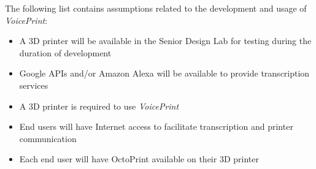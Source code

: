 The following list contains assumptions related to the development and usage of \textit{VoicePrint}:

\begin{itemize}
  \item A 3D printer will be available in the Senior Design Lab for testing during the duration of development
  \item Google APIs and/or Amazon Alexa will be available to provide transcription services
  \item A 3D printer is required to use \textit{VoicePrint}
  \item End users will have Internet access to facilitate transcription and printer communication
  \item Each end user will have OctoPrint available on their 3D printer
\end{itemize}